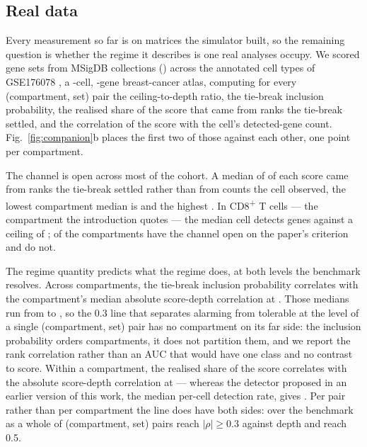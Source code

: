 \documentclass[11pt]{article}
\begin{document}
\subsection{Real data}

Every measurement so far is on matrices the simulator built, so the remaining
question is whether the regime it describes is one real analyses occupy. We
scored \benchSets{} gene sets from \benchCollections{} MSigDB collections
(\benchCollectionNames) \citep{liberzon2015} across the \benchGroups{} annotated
cell types of GSE176078 \citep{wu2021}, a \benchCells{}-cell,
\benchGenes{}-gene breast-cancer atlas, computing for every (compartment, set)
pair the ceiling-to-depth ratio, the tie-break inclusion probability, the
realised share of the score that came from ranks the tie-break settled, and the
correlation of the score with the cell's detected-gene count.
Fig.~\ref{fig:companion}b places the first two of those against each other, one
point per compartment.

The channel is open across most of the cohort. A median of
\benchRealisedShare{} of each score came from ranks the tie-break settled rather
than from counts the cell observed, the lowest compartment median is
\benchRealisedShareMin{} and the highest \benchRealisedShareMax. In
CD8\textsuperscript{+} T cells --- the compartment the introduction quotes ---
the median cell detects \benchMedianDetectedCdT{} genes against a ceiling of
\benchMaxRank{}; \benchChannelOpen{} of the \benchCompartments{} compartments
have the channel open on the paper's criterion and \benchChannelClosed{} do not.

The regime quantity predicts what the regime does, at both levels the benchmark
resolves. Across compartments, the tie-break inclusion probability correlates
with the compartment's median absolute score-depth correlation at
\benchLevelOneRho. Those medians run from \benchLevelOneAbsMin{} to
\benchLevelOneAbsMax, so the 0.3 line that separates alarming from tolerable at
the level of a single (compartment, set) pair has no compartment on its far
side: the inclusion probability orders compartments, it does not partition them,
and we report the rank correlation rather than an AUC that would have one class
and no contrast to score. Within a compartment, the realised share of the score
correlates with the absolute score-depth correlation at \benchShareVsAbsRho{}
--- whereas the detector proposed in an earlier version of this work, the median
per-cell detection rate, gives \benchDetVsAbsRho. Per pair rather than per
compartment the line does have both sides: over the benchmark as a whole
\benchFracAbsRhoGtThree{} of (compartment, set) pairs reach $|\rho| \geq 0.3$
against depth and \benchFracAbsRhoGtFive{} reach 0.5.
\end{document}

